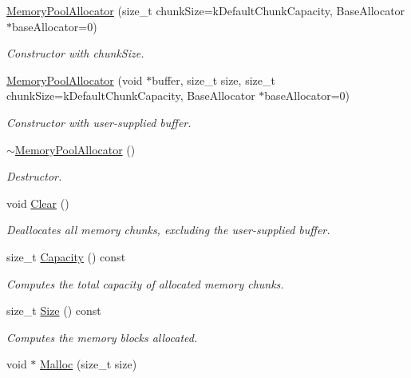 \begin{DoxyCompactItemize}
\item 
\hyperlink{class_memory_pool_allocator_aeec85ac657f242ac5620115141be5209}{Memory\+Pool\+Allocator} (size\+\_\+t chunk\+Size=k\+Default\+Chunk\+Capacity, Base\+Allocator $\ast$base\+Allocator=0)
\begin{DoxyCompactList}\small\item\em Constructor with chunk\+Size. \end{DoxyCompactList}\item 
\hyperlink{class_memory_pool_allocator_a1f0d865093fdb955d956b7a445a8ddbf}{Memory\+Pool\+Allocator} (void $\ast$buffer, size\+\_\+t size, size\+\_\+t chunk\+Size=k\+Default\+Chunk\+Capacity, Base\+Allocator $\ast$base\+Allocator=0)
\begin{DoxyCompactList}\small\item\em Constructor with user-\/supplied buffer. \end{DoxyCompactList}\item 
\hyperlink{class_memory_pool_allocator_ad4eee0ef3cfe8cda31034fbce98b7a9b}{$\sim$\+Memory\+Pool\+Allocator} ()
\begin{DoxyCompactList}\small\item\em Destructor. \end{DoxyCompactList}\item 
void \hyperlink{class_memory_pool_allocator_a57bbc80e570db6110901b9a7e36dbda0}{Clear} ()\hypertarget{class_memory_pool_allocator_a57bbc80e570db6110901b9a7e36dbda0}{}\label{class_memory_pool_allocator_a57bbc80e570db6110901b9a7e36dbda0}

\begin{DoxyCompactList}\small\item\em Deallocates all memory chunks, excluding the user-\/supplied buffer. \end{DoxyCompactList}\item 
size\+\_\+t \hyperlink{class_memory_pool_allocator_ac4738338f038d040641f23aa7955e2d3}{Capacity} () const 
\begin{DoxyCompactList}\small\item\em Computes the total capacity of allocated memory chunks. \end{DoxyCompactList}\item 
size\+\_\+t \hyperlink{class_memory_pool_allocator_a2ccb6c068b8b35dbc3680dc5563af2f4}{Size} () const 
\begin{DoxyCompactList}\small\item\em Computes the memory blocks allocated. \end{DoxyCompactList}\item 
void $\ast$ \hyperlink{class_memory_pool_allocator_a02f6832910453446cb77bf919ba49e99}{Malloc} (size\+\_\+t size)\hypertarget{class_memory_pool_allocator_a02f6832910453446cb77bf919ba49e99}{}\label{class_memory_pool_allocator_a02f6832910453446cb77bf919ba49e99}


\end{DoxyCompactItemize}
